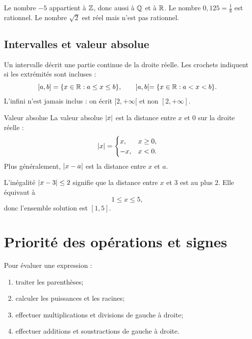 \begin{examplebox}
Le nombre $-5$ appartient à $\mathbb{Z}$, donc aussi à $\mathbb{Q}$ et à $\mathbb{R}$. Le nombre $0{,}125=\frac18$ est rationnel. Le nombre $\sqrt2$ est réel mais n'est pas rationnel.
\end{examplebox}

\subsection{Intervalles et valeur absolue}

Un intervalle décrit une partie continue de la droite réelle. Les crochets indiquent si les extrémités sont incluses :
\[
[a,b]=\{x\in\mathbb{R}:a\le x\le b\},\qquad ]a,b[=\{x\in\mathbb{R}:a<x<b\}.
\]
L'infini n'est jamais inclus : on écrit $[2,+\infty[$ et non $[2,+\infty]$.

\begin{definition}{Valeur absolue}{}
La valeur absolue $\left\lvert x\right\rvert$ est la distance entre $x$ et $0$ sur la droite réelle :
\[
\left\lvert x\right\rvert=\begin{cases}x,&x\ge0,\\-x,&x<0.\end{cases}
\]
Plus généralement, $\left\lvert x-a\right\rvert$ est la distance entre $x$ et $a$.
\end{definition}

\begin{examplebox}
L'inégalité $\left\lvert x-3\right\rvert\le2$ signifie que la distance entre $x$ et $3$ est au plus $2$. Elle équivaut à
\[
1\le x\le5,
\]
donc l'ensemble solution est $[1,5]$.
\end{examplebox}

\section{Priorité des opérations et signes}
\label{manual:section:01.02}

\begin{methodbox}
Pour évaluer une expression :
\begin{enumerate}
\item traiter les parenthèses;
\item calculer les puissances et les racines;
\item effectuer multiplications et divisions de gauche à droite;
\item effectuer additions et soustractions de gauche à droite.
\end{enumerate}
\end{methodbox}

